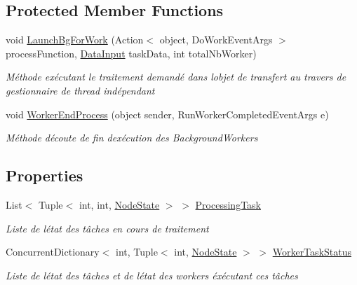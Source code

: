 \subsection*{Protected Member Functions}
\begin{DoxyCompactItemize}
\item 
void \hyperlink{class_node_net_1_1_network_1_1_nodes_1_1_default_node_a30949cd4bd60b1237c75cb6113c8072c}{Launch\+Bg\+For\+Work} (Action$<$ object, Do\+Work\+Event\+Args $>$ process\+Function, \hyperlink{class_node_net_1_1_data_1_1_data_input}{Data\+Input} task\+Data, int total\+Nb\+Worker)
\begin{DoxyCompactList}\small\item\em Méthode exécutant le traitement demandé dans l\textquotesingle{}objet de transfert au travers de gestionnaire de thread indépendant \end{DoxyCompactList}\item 
void \hyperlink{class_node_net_1_1_network_1_1_nodes_1_1_default_node_ac5ff229c6de7f4c1035a9d6a7ba3d2ac}{Worker\+End\+Process} (object sender, Run\+Worker\+Completed\+Event\+Args e)
\begin{DoxyCompactList}\small\item\em Méthode d\textquotesingle{}écoute de fin d\textquotesingle{}exécution des Background\+Workers \end{DoxyCompactList}\end{DoxyCompactItemize}
\subsection*{Properties}
\begin{DoxyCompactItemize}
\item 
List$<$ Tuple$<$ int, int, \hyperlink{namespace_node_net_1_1_network_1_1_states_a0c130cd0043f8c509dddba2cf1fd2f36}{Node\+State} $>$ $>$ \hyperlink{class_node_net_1_1_network_1_1_nodes_1_1_default_node_a7d3d64c38741aa7ac4a57916abdbe6f9}{Processing\+Task}
\begin{DoxyCompactList}\small\item\em Liste de l\textquotesingle{}état des tâches en cours de traitement \end{DoxyCompactList}\item 
Concurrent\+Dictionary$<$ int, Tuple$<$ int, \hyperlink{namespace_node_net_1_1_network_1_1_states_a0c130cd0043f8c509dddba2cf1fd2f36}{Node\+State} $>$ $>$ \hyperlink{class_node_net_1_1_network_1_1_nodes_1_1_default_node_a7c90a915b0464ab0cec6805ad275a66d}{Worker\+Task\+Status}
\begin{DoxyCompactList}\small\item\em Liste de l\textquotesingle{}état des tâches et de l\textquotesingle{}état des workers éxécutant ces tâches \end{DoxyCompactList}\end{DoxyCompactItemize}
